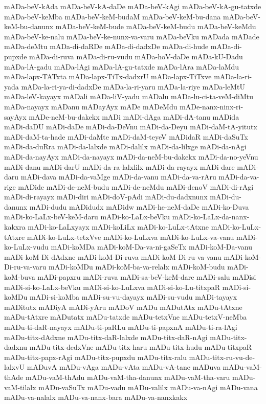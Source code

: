{mADa-beV-kAda
mADa-beV-kA-daDe
mADa-beV-kAgi
mADa-beV-kA-gu-tatxde
mADa-beV-keMba
mADa-beV-keM-budaM
mADa-beV-keM-bu-dana
mADa-beV-keM-bu-danunx
mADa-beV-keM-bude
mADa-beV-keM-budu
mADa-beV-keMdu
mADa-beV-ke-nalu
mADa-beV-ke-nunx-va-varu
mADa-beVku
mADada
mADade
mADa-deMtu
mADa-di-daRDe
mADa-di-dadxDe
mADa-di-hude
mADa-di-pupxde
mADa-di-ruva
mADa-di-ru-vudu
mADa-hoV-daDe
mADa-kU-Dadu
mADa-lA-gadu
mADa-lAgi
mADa-lA-gu-tatxde
mADa-lAra
mADa-laMdu
mADa-lapx-TATxta
mADa-lapx-TiTx-dadxrU
mADa-lapx-TiTxve
mADa-la-ri-yada
mADa-la-ri-ya-di-dadxDe
mADa-la-ri-yaru
mADa-la-riye
mADa-leMtU
mADa-leV-kayayx
mADali
mADa-liV-yadu
mADalu
mADa-lu-ci-ta-veM-diMtu
mADa-nayayx
mADanu
mADayAyx
mADe
mADeMdu
mADe-nanx-ninx-ri-sayAyx
mADe-neM-bu-dakekx
mADi
mADi-dAga
mADi-dA-tanu
mADida
mADi-daDU
mADi-daDe
mADi-da-DeVnu
mADi-da-Deyu
mADi-daM-tA-yitutx
mADi-daM-ta-hade
mADi-daMte
mADi-daM-teyeV
mADidaR
mADi-daSuTx
mADi-da-duRra
mADi-da-lalxde
mADi-dalilx
mADi-da-lilxge
mADi-da-nAgi
mADi-da-nayAyx
mADi-da-nayayx
mADi-da-neM-bu-dakekx
mADi-da-no-yeVnu
mADi-danu
mADi-darU
mADi-da-ra-lalxlilx
mADi-da-rayayx
mADi-dare
mADi-daru
mADi-dava
mADi-da-vaMge
mADi-da-vanu
mADi-da-va-rAru
mADi-da-va-rige
mADide
mADi-de-neM-budu
mADi-de-neMdu
mADi-denoV
mADi-di-rAgi
mADi-di-rayayx
mADi-diri
mADi-doV-pAdi
mADi-du-dadxnunx
mADi-du-danunx
mADi-dudu
mADidudx
mADidw
mADi-he-neM-daDe
mADi-ko-Duva
mADi-ko-LaLx-beV-keM-daru
mADi-ko-LaLx-beVku
mADi-ko-LaLx-da-nanx-kakxra
mADi-ko-LaLxyayx
mADi-koLiLx
mADi-ko-LuLx-tAtxne
mADi-ko-LuLx-tAtxre
mADi-ko-LuLx-tetxVve
mADi-ko-LuLxva
mADi-ko-LuLx-va-vanu
mADi-ko-LuLx-vudu
mADi-koMDa
mADi-koM-Da-va-ni-gaSeTx
mADi-koM-Da-vanu
mADi-koM-Di-dAdxne
mADi-koM-Di-ruva
mADi-koM-Di-ru-va-vanu
mADi-koM-Di-ru-va-varu
mADi-koMDu
mADi-koM-ba-va-relalx
mADi-koM-budu
mADi-koM-buva
mADi-papxru
mADi-ruva
mADi-sa-beV-keM-dare
mADi-salu
mADisi
mADi-si-ko-LaLx-beVku
mADi-si-ko-LuLxva
mADi-si-ko-Lu-titxpaR
mADi-si-koMDu
mADi-si-koMba
mADi-su-vu-dayayx
mADi-su-vudu
mADi-tayayx
mADitutx
mADiyA
mADi-yAru
mADoV
mADu
mADutAtx
mADu-tAtxne
mADu-tAtxre
mADutatx
mADu-tatxde
mADu-tetxVne
mADu-tetxV-neMba
mADu-ti-daR-nayayx
mADu-ti-paRLu
mADu-ti-papxnA
mADu-ti-ra-lAgi
mADu-titx-dAdxne
mADu-titx-daR-lalxde
mADu-titx-daR-nAgi
mADu-titx-dadxnu
mADu-titx-dedxVne
mADu-titx-haru
mADu-titx-hudu
mADu-titxpaR
mADu-titx-papx-rAgi
mADu-titx-pupxdu
mADu-titx-ralu
mADu-titx-ru-vu-de-lalxvU
mADuvA
mADu-vAga
mADu-vAta
mADu-vA-tane
mADuva
mADu-vaM-thAde
mADu-vaM-thAdu
mADu-vaM-tha-danunx
mADu-vaM-tha-varu
mADu-vaM-tilalx
mADu-vaSuTx
mADu-vadu
mADu-valilx
mADu-va-nAgi
mADu-vana
mADu-va-nalalx
mADu-va-nanx-bara
mADu-va-nanxkakx
}
